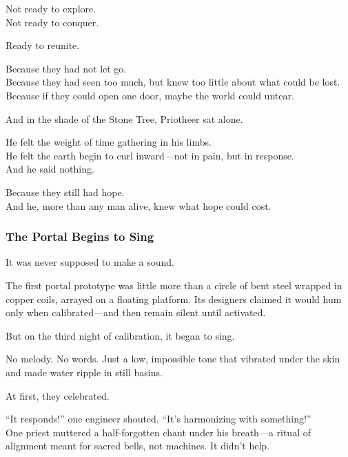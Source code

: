 \documentclass[12pt]{article}
\begin{document}
\vspace{0.5em}
Not ready to explore.\\
Not ready to conquer.

\vspace{0.5em}
Ready to reunite.

\vspace{0.5em}
Because they had not let go.\\
Because they had seen too much, but knew too little about what could be lost.\\
Because if they could open one door, maybe the world could untear.

\vspace{0.5em}
And in the shade of the Stone Tree, Priotheer sat alone.

\vspace{0.5em}
He felt the weight of time gathering in his limbs.\\
He felt the earth begin to curl inward---not in pain, but in response.\\
And he said nothing.

\vspace{0.5em}
Because they still had hope.\\
And he, more than any man alive, knew what hope could cost.


\dotfill


\subsubsection*{The Portal Begins to Sing}

It was never supposed to make a sound.

\vspace{0.5em}
The first portal prototype was little more than a circle of bent steel wrapped in copper coils, arrayed on a floating platform. Its designers claimed it would hum only when calibrated---and then remain silent until activated.

\vspace{0.5em}
But on the third night of calibration, it began to sing.

\vspace{0.5em}
No melody. No words. Just a low, impossible tone that vibrated under the skin and made water ripple in still basins.

\vspace{0.5em}
At first, they celebrated.

\vspace{0.5em}
``It responds!'' one engineer shouted. ``It’s harmonizing with something!''\\
One priest muttered a half-forgotten chant under his breath---a ritual of alignment meant for sacred bells, not machines. It didn’t help.
\end{document}
